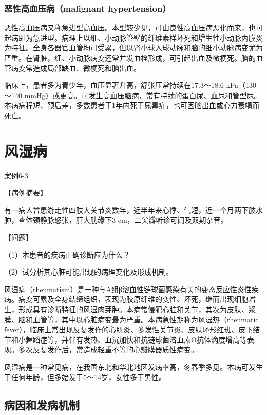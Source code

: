 \subsubsection{恶性高血压病（malignant hypertension）}

恶性高血压病又称急进型高血压。本型较少见，可由良性高血压病恶化而来，也可起病即为急进型。病理上以细、小动脉管壁的纤维素样坏死和增生性小动脉内膜炎为特征。全身各器官血管均可受累，但以肾小球入球动脉和脑的细小动脉病变尤为严重。在肾脏，细、小动脉病变还常并发血栓形成，可引起出血及微梗死。脑的血管病变常造成局部缺血、微梗死和脑出血。

临床上，患者多为青少年，血压显著升高，舒张压常持续在17.3～18.6
kPa（130～140
mmHg）或更高。可发生高血压脑病，常有持续的蛋白尿、血尿和管型尿。本病病程短、预后差，多数患者于1年内死于尿毒症，也可因脑出血或心力衰竭而死亡。

\section{风湿病}
\begin{framed}
    {案例6-3}

    {【病例摘要】}

    有一病人曾患游走性四肢大关节炎数年，近半年来心悸、气短，近一个月两下肢水肿，查体颈静脉怒张，肝大肋缘下3
    cm，二尖瓣听诊可闻及双期杂音。

    {【问题】}

    （1）本患者的疾病正确诊断应为什么？

    （2）试分析其心脏可能出现的病理变化及形成机制。
\end{framed}

风湿病（rheumatism）是一种与A组β溶血性链球菌感染有关的变态反应性炎性疾病。病变可累及全身结缔组织，表现为胶原纤维的变性、坏死，继而出现细胞增生，形成具有诊断特征的风湿肉芽肿。本病常侵犯心脏和关节，其次为皮肤、浆膜、脑和血管等，其中以心脏病变最为严重。本病急性期称为风湿热（rheumatic
fever），临床上常出现反复发作的心肌炎、多发性关节炎、皮肤环形红斑、皮下结节和小舞蹈症等，并伴有发热、血沉加快和抗链球菌溶血素O抗体滴度增高等表现。多次反复发作后，常造成轻重不等的心瓣膜器质性病变。

风湿病是一种常见病，在我国东北和华北地区发病率高，冬春季多见。本病可发生于任何年龄，但多始发于5～14岁，女性多于男性。

\subsection{病因和发病机制}

